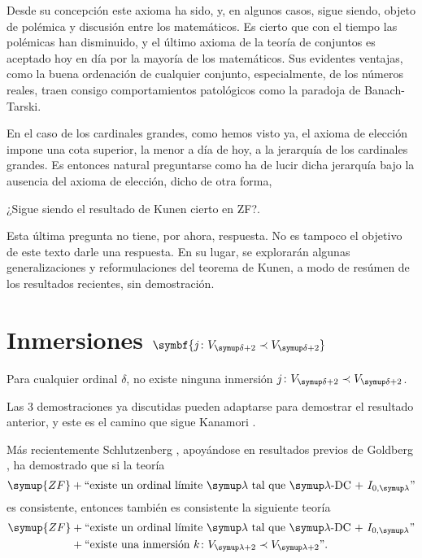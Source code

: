 Desde su concepción este axioma ha sido, y, en algunos casos,
sigue siendo, objeto de polémica y discusión entre los matemáticos.
Es cierto que con el tiempo las polémicas han disminuido, y el último
axioma de la teoría de conjuntos es aceptado hoy en día por la mayoría
de los matemáticos.
Sus evidentes ventajas, como la buena ordenación de cualquier conjunto,
especialmente, de los números reales, traen consigo comportamientos
patológicos como la paradoja de Banach-Tarski.

En el caso de los cardinales grandes, como hemos visto ya,
el axioma de elección impone una cota superior, la menor a día de hoy,
a la jerarquía de los cardinales grandes. Es entonces natural preguntarse
como ha de lucir dicha jerarquía bajo la ausencia del axioma de elección,
dicho de otra forma, 

\begin{ques}\label{ques:open}
¿Sigue siendo el resultado de Kunen cierto en ZF?.
\end{ques}

Esta última pregunta no tiene, por ahora, respuesta. No es tampoco
el objetivo de este texto darle una respuesta. En su lugar,
se explorarán algunas generalizaciones y reformulaciones del teorema
de Kunen, a modo de resúmen de los resultados recientes, sin demostración.

\section%
{%
    Inmersiones \texorpdfstring{$\symbf{j\colon V_{\delta+2}\embed V_{\delta+2}}$}{j: V-> V}
}

\begin{teo}
    Para cualquier ordinal $\delta$, no existe ninguna inmersión 
    $j\colon V_{\delta+2}\embed V_{\delta+2}$.
\end{teo}

Las 3 demostraciones ya discutidas pueden adaptarse para demostrar
el resultado anterior, y este es el camino que sigue Kanamori
\autocite[Corolario 23.14]{kanamori_higher_2009}.

Más recientemente Schlutzenberg \autocite{schlutzenberg_consistency_2024},
apoyándose en resultados previos de Goldberg \autocite{goldberg_even_2021},
ha demostrado que si la teoría
\[
    \symup{ZF} + \text{``existe un ordinal límite $\lambda$ tal que $\lambda$-DC~+~$I_{0,\lambda}$''}
\]
es consistente, entonces también es consistente la siguiente teoría
\begin{align*}
    \symup{ZF} &+ \text{``existe un ordinal límite $\lambda$ tal que $\lambda$-DC~+~$I_{0,\lambda}$''}\\
               &+ \text{``existe una inmersión $k\colon V_{\lambda+2}\embed V_{\lambda+2}$''}.
\end{align*}

